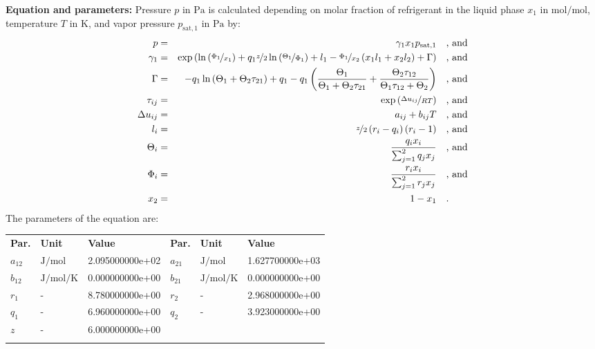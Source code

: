\textbf{Equation and parameters:}
\newline
%
Pressure $p$ in $\si{\pascal}$ is calculated depending on molar fraction of refrigerant in the liquid phase $x_1$ in $\si{\mole\per\mole}$, temperature $T$ in $\si{\kelvin}$, and vapor pressure $p_\mathrm{sat,1}$ in $\si{\pascal}$ by:
%
\begin{equation*}
\begin{split}
p &=& \gamma_1 x_1 p_\mathrm{sat,1} & \quad\text{, and} \\
\gamma_1 &=& \exp \left( \ln \left( \nicefrac{\Phi_1}{x_1} \right) + q_1 \nicefrac{z}{2} \ln \left( \nicefrac{\Theta_1}{\Phi_1} \right) + l_1 - \nicefrac{\Phi_1}{x_2} \left( x_1 l_1 + x_2 l_2 \right) + \Gamma \right) & \quad\text{, and} \\
\Gamma &=& - q_1 \ln \left( \Theta_1 + \Theta_2 \tau_{21} \right) + q_1 - q_1 \left( \frac{\Theta_1}{\Theta_1 + \Theta_2 \tau_{21}} + \frac{\Theta_2 \tau_{12}}{\Theta_1 \tau_{12} + \Theta_2} \right) & \quad\text{, and} \\
\tau_{ij} &=& \exp \left( \nicefrac{\Delta u_{ij}}{R T} \right) & \quad\text{, and} \\
\Delta u_{ij} &=& a_{ij} + b_{ij} T & \quad\text{, and} \\
l_i &=& \nicefrac{z}{2} \left( r_i - q_i \right) \left(r_i - 1 \right) & \quad\text{, and} \\
\Theta_i &=& \frac{q_i x_i}{\sum_{j=1}^{2} q_j x_j} & \quad\text{, and} \\
\Phi_i &=& \frac{r_i x_i}{\sum_{j=1}^{2} r_j x_j} & \quad\text{, and} \\
x_2 &=& 1 - x_1  & \quad\text{.} \\
\end{split}
\end{equation*}
%
The parameters of the equation are:
%
\begin{longtable}[l]{lll|lll}
\toprule
\addlinespace
\textbf{Par.} & \textbf{Unit} & \textbf{Value} &	\textbf{Par.} & \textbf{Unit} & \textbf{Value} \\
\addlinespace
\midrule
\endhead

\bottomrule
\endfoot
\bottomrule
\endlastfoot
\addlinespace

$a_{12}$ & $\si{\joule\per\mole}$ & 2.095000000e+02 & $a_{21}$ & $\si{\joule\per\mole}$ & 1.627700000e+03 \\
$b_{12}$ & $\si{\joule\per\mole\per\kelvin}$ & 0.000000000e+00 & $b_{21}$ & $\si{\joule\per\mole\per\kelvin}$ & 0.000000000e+00 \\
$r_{1}$ & - & 8.780000000e+00 & $r_{2}$ & - & 2.968000000e+00 \\
$q_{1}$ & - & 6.960000000e+00 & $q_{2}$ & - & 3.923000000e+00 \\
$z$ & - & 6.000000000e+00 & & &  \\

\addlinespace\end{longtable}

